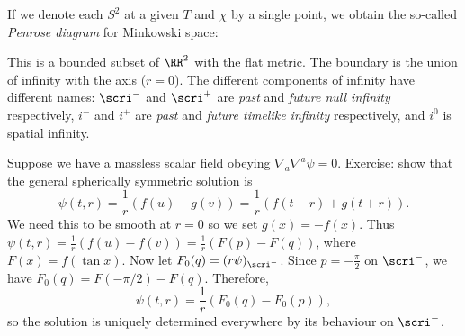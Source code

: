 \documentclass{jknotes}
\begin{document}
If we denote each \(S^2\) at a given \(T\) and \(\chi\) by a single point, we obtain the so-called \emph{Penrose diagram} for Minkowski space:
\begin{figure}[H]
    \centering
\end{figure}
This is a bounded subset of \(\RR^2\) with the flat metric. The boundary is the union of infinity with the axis (\(r=0\)). The different components of infinity have different names: \(\scri^-\) and \(\scri^+\) are \emph{past} and \emph{future null infinity} respectively, \(i^-\) and \(i^+\) are \emph{past} and \emph{future timelike infinity} respectively, and \(i^0\) is spatial infinity.

Suppose we have a massless scalar field obeying \(\nabla_a\nabla^a\psi=0\). Exercise: show that the general spherically symmetric solution is
\begin{equation}
    \psi(t,r) = \frac{1}{r}\left(f(u)+g(v)\right) = \frac{1}{r}\left(f(t-r)+g(t+r)\right).
\end{equation}
We need this to be smooth at \(r=0\) so we set \(g(x) = -f(x)\). Thus \(\psi(t,r) = \frac{1}{r}\left(f(u)-f(v)\right) = \frac{1}{r}\left(F(p)-F(q)\right)\), where \(F(x) = f(\tan x)\). Now let \(F_0(q) = (r\psi)_{\scri^-}\). Since \(p=-\frac{\pi}{2}\) on \(\scri^-\), we have \(F_0(q) = F(-\pi/2) - F(q)\). Therefore,
\begin{equation}
    \psi(t,r) = \frac{1}{r}\left(F_0(q)-F_0(p)\right),
\end{equation}
so the solution is uniquely determined everywhere by its behaviour on \(\scri^-\).
\end{document}
